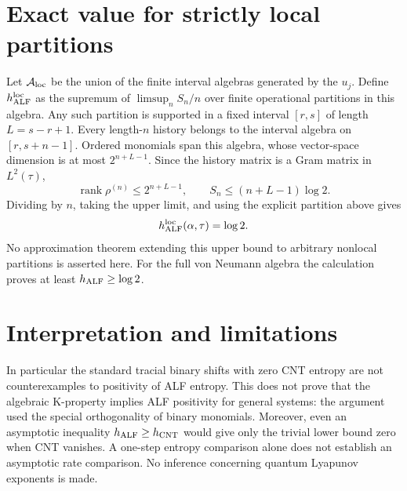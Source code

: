 \documentclass[11pt,a4paper]{article}
\begin{document}
\section*{Exact value for strictly local partitions}
Let $\mathcal A_{\rm loc}$ be the union of the finite interval algebras generated by the $u_j$. Define $h_{\rm ALF}^{\rm loc}$ as the supremum of $\limsup_n S_n/n$ over finite operational partitions in this algebra. Any such partition is supported in a fixed interval $[r,s]$ of length $L=s-r+1$. Every length-$n$ history belongs to the interval algebra on $[r,s+n-1]$. Ordered monomials span this algebra, whose vector-space dimension is at most $2^{n+L-1}$. Since the history matrix is a Gram matrix in $L^2(\tau)$,
\[\operatorname{rank}\rho^{(n)}\leq2^{n+L-1},\qquad S_n\leq(n+L-1)\log2.\]
Dividing by $n$, taking the upper limit, and using the explicit partition above gives
\[h_{\rm ALF}^{\rm loc}(\alpha,\tau)=\log2.\]
No approximation theorem extending this upper bound to arbitrary nonlocal partitions is asserted here. For the full von Neumann algebra the calculation proves at least $h_{\rm ALF}\geq\log2$.

\section*{Interpretation and limitations}
In particular the standard tracial binary shifts with zero CNT entropy are not counterexamples to positivity of ALF entropy. This does not prove that the algebraic K-property implies ALF positivity for general systems: the argument used the special orthogonality of binary monomials. Moreover, even an asymptotic inequality $h_{\rm ALF}\geq h_{\rm CNT}$ would give only the trivial lower bound zero when CNT vanishes. A one-step entropy comparison alone does not establish an asymptotic rate comparison. No inference concerning quantum Lyapunov exponents is made.
\end{document}
